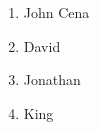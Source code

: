 \documentclass{article}
\begin{document}
	\begin{enumerate}
		\item John Cena
		\item David
		\item Jonathan
		\item King
	\end{enumerate}
\end{document}
